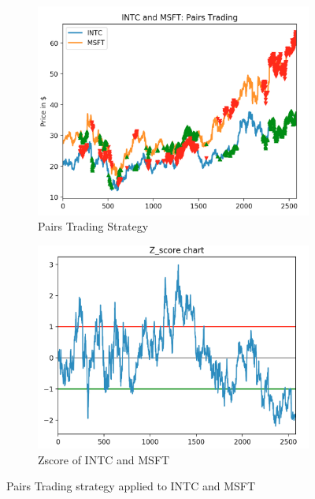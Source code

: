 \documentclass[letterpaper,11pt]{article}
\begin{document}
\begin{figure}[h]
\centering
\begin{subfigure}[t]{0.45\textwidth}
\includegraphics[width=\textwidth]{Intc_msft_signals.png}
\caption{Pairs Trading Strategy  \label{overflow}}
\end{subfigure}
\begin{subfigure}[t]{0.45\textwidth}
\includegraphics[width=\textwidth]{zscore.png}
\caption{Zscore of INTC and  MSFT \label{overflow}}
\end{subfigure}

\caption{Pairs Trading strategy applied to INTC and MSFT  \label{overflow}}
\label{PAIRSfigure}
\end{figure}
\end{document}
